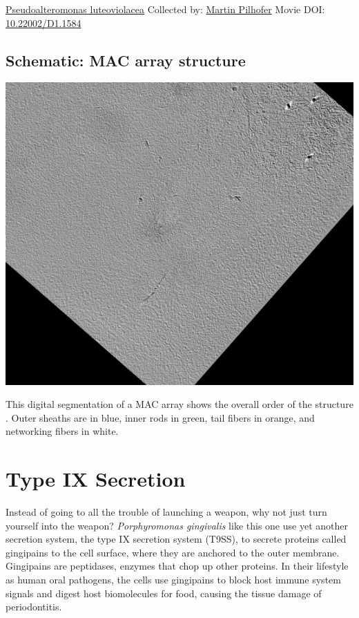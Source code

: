 \documentclass[]{tufte-book}
\begin{document}
\hypertarget{htmlwidget-782e1de19cfffc4a2242}{}

\label{fig:9-7b}\protect\hyperlink{tree}{Pseudoalteromonas luteoviolacea} Collected by: \protect\hyperlink{martin_pilhofer}{Martin Pilhofer} Movie DOI: \href{https://doi.org/10.22002/D1.1584}{10.22002/D1.1584}

\hypertarget{MAC_array_structure}{%
\subsection*{Schematic: MAC array structure}\label{MAC_array_structure}}

\includegraphics{img/schematics/9_7_2}

This digital segmentation of a MAC array shows the overall order of the structure \citep{shikuma2014}. Outer sheaths are in blue, inner rods in green, tail fibers in orange, and networking fibers in white.

\hypertarget{type-ix-secretion}{%
\section{Type IX Secretion}\label{type-ix-secretion}}

Instead of going to all the trouble of launching a weapon, why not just turn yourself into the weapon? \emph{Porphyromonas gingivalis} like this one use yet another secretion system, the type IX secretion system (T9SS), to secrete proteins called gingipains to the cell surface, where they are anchored to the outer membrane. Gingipains are peptidases, enzymes that chop up other proteins. In their lifestyle as human oral pathogens, the cells use gingipains to block host immune system signals and digest host biomolecules for food, causing the tissue damage of periodontitis.
\end{document}
